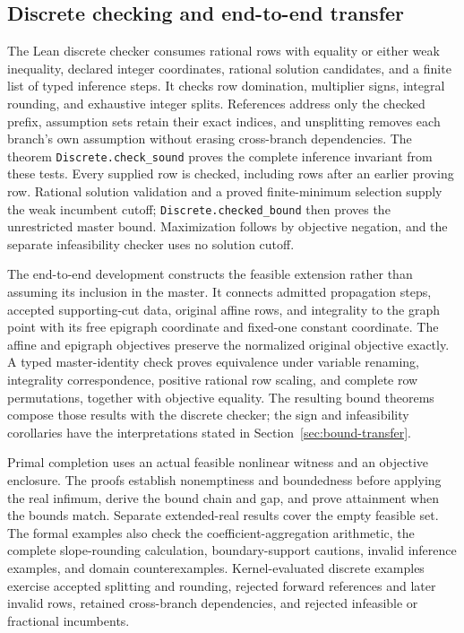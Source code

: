 \subsection{Discrete checking and end-to-end transfer}
The Lean discrete checker consumes rational rows with equality or either weak inequality, declared integer coordinates, rational solution candidates, and a finite list of typed inference steps. It checks row domination, multiplier signs, integral rounding, and exhaustive integer splits. References address only the checked prefix, assumption sets retain their exact indices, and unsplitting removes each branch's own assumption without erasing cross-branch dependencies. The theorem \texttt{Discrete.check\_sound} proves the complete inference invariant from these tests. Every supplied row is checked, including rows after an earlier proving row. Rational solution validation and a proved finite-minimum selection supply the weak incumbent cutoff; \texttt{Discrete.checked\_bound} then proves the unrestricted master bound. Maximization follows by objective negation, and the separate infeasibility checker uses no solution cutoff.

The end-to-end development constructs the feasible extension rather than assuming its inclusion in the master. It connects admitted propagation steps, accepted supporting-cut data, original affine rows, and integrality to the graph point with its free epigraph coordinate and fixed-one constant coordinate. The affine and epigraph objectives preserve the normalized original objective exactly. A typed master-identity check proves equivalence under variable renaming, integrality correspondence, positive rational row scaling, and complete row permutations, together with objective equality. The resulting bound theorems compose those results with the discrete checker; the sign and infeasibility corollaries have the interpretations stated in Section~\ref{sec:bound-transfer}.

Primal completion uses an actual feasible nonlinear witness and an objective enclosure. The proofs establish nonemptiness and boundedness before applying the real infimum, derive the bound chain and gap, and prove attainment when the bounds match. Separate extended-real results cover the empty feasible set. The formal examples also check the coefficient-aggregation arithmetic, the complete slope-rounding calculation, boundary-support cautions, invalid inference examples, and domain counterexamples. Kernel-evaluated discrete examples exercise accepted splitting and rounding, rejected forward references and later invalid rows, retained cross-branch dependencies, and rejected infeasible or fractional incumbents.

